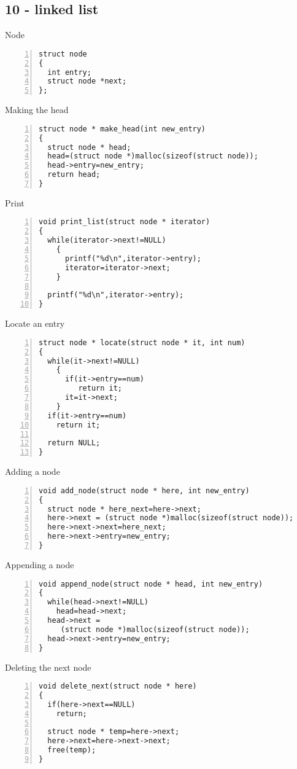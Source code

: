 \documentclass{beamer}
\begin{document}
\subsection*{10 - linked list}
\begin{frame}[fragile]{Node}
\begin{lstlisting}[numbers=left]
struct node
{
  int entry;
  struct node *next;
};
\end{lstlisting}
\end{frame}
\begin{frame}[fragile]{Making the head}
\begin{lstlisting}[numbers=left]
struct node * make_head(int new_entry)
{
  struct node * head;
  head=(struct node *)malloc(sizeof(struct node));
  head->entry=new_entry;
  return head;
}
\end{lstlisting}
\end{frame}
\begin{frame}[fragile]{Print}
\begin{lstlisting}[numbers=left]
void print_list(struct node * iterator)
{
  while(iterator->next!=NULL)
    {
      printf("%d\n",iterator->entry);
      iterator=iterator->next;
    }

  printf("%d\n",iterator->entry);
}
\end{lstlisting}
\end{frame}
\begin{frame}[fragile]{Locate an entry}
\begin{lstlisting}[numbers=left]
struct node * locate(struct node * it, int num)
{
  while(it->next!=NULL)
    {
      if(it->entry==num)
         return it;
      it=it->next;
    }
  if(it->entry==num)
    return it;

  return NULL;
}
\end{lstlisting}
\end{frame}
\begin{frame}[fragile]{Adding a node}
\begin{lstlisting}[numbers=left]
void add_node(struct node * here, int new_entry)
{
  struct node * here_next=here->next;
  here->next = (struct node *)malloc(sizeof(struct node));
  here->next->next=here_next;
  here->next->entry=new_entry;
}
\end{lstlisting}
\end{frame}
\begin{frame}[fragile]{Appending a node}
\begin{lstlisting}[numbers=left]
void append_node(struct node * head, int new_entry)
{
  while(head->next!=NULL)
    head=head->next;
  head->next = 
     (struct node *)malloc(sizeof(struct node));
  head->next->entry=new_entry;
}
\end{lstlisting}
\end{frame}
\begin{frame}[fragile]{Deleting the next node}
\begin{lstlisting}[numbers=left]
void delete_next(struct node * here)
{
  if(here->next==NULL)
    return;

  struct node * temp=here->next;
  here->next=here->next->next;
  free(temp);
}
\end{lstlisting}
\end{frame}
\end{document}
